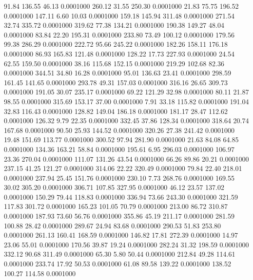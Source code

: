   91.84  136.55   46.13   0.0001000
 260.12   31.55  250.30   0.0001000
  21.83   75.75  196.52   0.0001000
 147.11    6.60   10.03   0.0001000
 159.18  145.94  311.48   0.0001000
 271.54   32.74  335.72   0.0001000
 319.62   77.38  134.21   0.0001000
 190.38  149.27   48.04   0.0001000
  83.84   22.20  195.31   0.0001000
 233.80   73.49  100.12   0.0001000
 179.56   99.38  286.29   0.0001000
 222.72   95.66  245.22   0.0001000
 182.26  158.11  176.18   0.0001000
  86.93  165.83  121.48   0.0001000
 128.22   17.73  227.93   0.0001000
  24.54   62.55  159.50   0.0001000
  38.16  115.68  152.15   0.0001000
 219.29  102.68   82.36   0.0001000
 344.51   34.80   16.28   0.0001000
  95.01  136.63   23.41   0.0001000
 298.59  161.45  141.65   0.0001000
 293.78   49.31  157.03   0.0001000
 316.16   26.65  309.73   0.0001000
 191.05   30.07  235.17   0.0001000
  69.22  121.29   32.98   0.0001000
  80.11   21.87   98.55   0.0001000
 315.69  153.17   37.00   0.0001000
   7.91   33.18  115.82   0.0001000
 191.04   32.83  116.43   0.0001000
 128.82  149.04  186.18   0.0001000
 181.17   28.47  112.62   0.0001000
 126.32    9.79   22.35   0.0001000
 332.45   37.86  128.34   0.0001000
 318.64   20.74  167.68   0.0001000
  90.50   25.93  144.52   0.0001000
 320.26   27.38  241.42   0.0001000
  19.48  151.69  113.77   0.0001000
 300.52   97.94  281.90   0.0001000
  21.63   84.08   64.85   0.0001000
 134.36  163.21   58.84   0.0001000
 195.61    6.95  296.03   0.0001000
 106.97   23.36  270.04   0.0001000
 111.07  131.26   43.54   0.0001000
  66.26   89.86   20.21   0.0001000
 237.15   41.25  121.27   0.0001000
 314.06   22.22  320.49   0.0001000
  79.84   22.40  218.01   0.0001000
 237.94   25.45  151.76   0.0001000
 230.10    7.73  268.76   0.0001000
 169.55   30.02  305.20   0.0001000
 306.71  107.85  327.95   0.0001000
  46.12   23.57  137.02   0.0001000
 150.29   79.44  118.83   0.0001000
 336.94   73.66  243.30   0.0001000
 321.59  117.83  301.72   0.0001000
 165.23  101.05   70.79   0.0001000
 213.00   86.72  310.87   0.0001000
 187.93   73.60   56.76   0.0001000
 355.86   45.19  211.17   0.0001000
 281.59  100.88   28.42   0.0001000
 289.67   24.94   83.68   0.0001000
 290.53   51.83  253.80   0.0001000
 261.13  160.41  168.59   0.0001000
 146.82   17.81  272.39   0.0001000
  14.97   23.06   55.01   0.0001000
 170.56   39.87   19.24   0.0001000
 282.24   31.32  198.59   0.0001000
 332.12   90.68  311.49   0.0001000
  65.30    5.80   50.44   0.0001000
 212.84   49.28  114.61   0.0001000
 233.74   17.92   50.53   0.0001000
  61.08   89.58  139.22   0.0001000
 138.52  100.27  114.58   0.0001000
